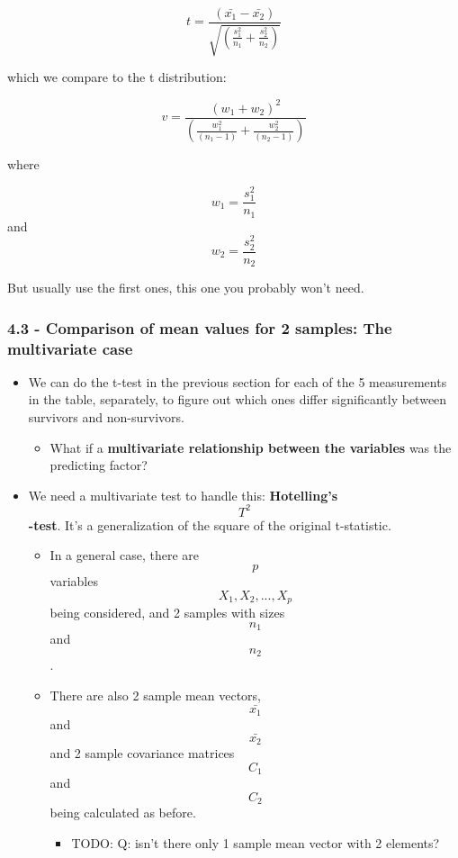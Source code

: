 \documentclass[]{article}
\providecommand{\tightlist}{%
  \setlength{\itemsep}{0pt}\setlength{\parskip}{0pt}}
\begin{document}
\[t = \frac{(\bar{x_1} - \bar{x_2})}{\sqrt{(\frac{s_1^2}{n_1} + \frac{s_2^2}{n_2})}}\]

which we compare to the t distribution:

\[v = \frac{(w_1 + w_2)^2}{(\frac{w_1^2}{(n_1 - 1)} + \frac{w_2^2}{(n_2 - 1)})}\]

where

\[w_1 = \frac{s_1^2}{n_1}\] and \[w_2 = \frac{s_2^2}{n_2}\]

But usually use the first ones, this one you probably won't need.

\hypertarget{comparison-of-mean-values-for-2-samples-the-multivariate-case}{%
\subsubsection{4.3 - Comparison of mean values for 2 samples: The
multivariate
case}\label{comparison-of-mean-values-for-2-samples-the-multivariate-case}}

\begin{itemize}
\tightlist
\item
  We can do the t-test in the previous section for each of the 5
  measurements in the table, separately, to figure out which ones differ
  significantly between survivors and non-survivors.

  \begin{itemize}
  \tightlist
  \item
    What if a \textbf{multivariate relationship between the variables}
    was the predicting factor?
  \end{itemize}
\item
  We need a multivariate test to handle this: \textbf{Hotelling's}
  \[T^2\]\textbf{-test}. It's a generalization of the square of the
  original t-statistic.

  \begin{itemize}
  \tightlist
  \item
    In a general case, there are \[p\] variables \[X_1, X_2, ..., X_p\]
    being considered, and 2 samples with sizes \[n_1\] and \[n_2\].
  \item
    There are also 2 sample mean vectors, \[\bar{x_1}\] and
    \[\bar{x_2}\] and 2 sample covariance matrices \[C_1\] and \[C_2\]
    being calculated as before.

    \begin{itemize}
    \tightlist
    \item
      TODO: Q: isn't there only 1 sample mean vector with 2 elements?
    \end{itemize}
  \end{itemize}
\end{itemize}
\end{document}
